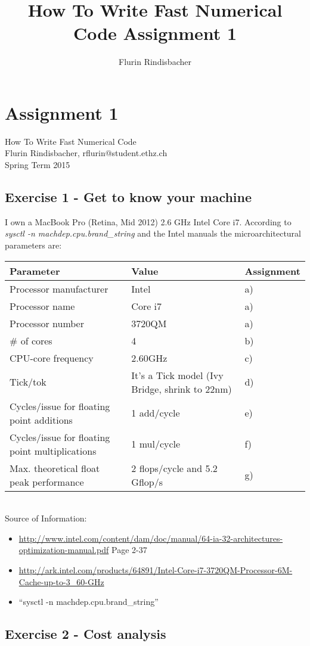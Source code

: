 \documentclass[10pt,a4paper,oneside]{report}
\author{Flurin Rindisbacher}
\title{How To Write Fast Numerical Code Assignment 1}
\begin{document}
\chapter*{Assignment 1}
How To Write Fast Numerical Code \\
Flurin Rindisbacher, rflurin@student.ethz.ch \\
Spring Term 2015
\section*{Exercise 1 - Get to know your machine}
I own a MacBook Pro (Retina, Mid 2012) 2.6 GHz Intel Core i7. According to \textit{sysctl -n machdep.cpu.brand\_string} and the Intel manuals the microarchitectural parameters are: \\

\begin{tabular}{|l|l|l|}
\hline 
\rowcolor{gray!30}
\textbf{Parameter} & \textbf{Value} & \textbf{Assignment} \\ 
\hline 
Processor manufacturer & Intel & a)\\ 
\hline 
Processor name & Core i7 & a)\\ 
\hline
Processor number & 3720QM  & a)\\ 
\hline
\# of cores & 4  & b) \\ 
\hline 
CPU-core frequency & 2.60GHz  & c)\\ 
\hline 
Tick/tok & It's a Tick model (Ivy Bridge, shrink to 22nm) & d) \\ 
\hline 
Cycles/issue for floating point additions & 1 add/cycle & e) \\ 
\hline 
Cycles/issue for floating point multiplications & 1 mul/cycle & f) \\ 
\hline 
Max. theoretical float peak performance & 2 flops/cycle and 5.2 Gflop/s & g) \\ 
\hline 
\end{tabular} 
\\
Source of Information:
\begin{itemize}
  \item \url{http://www.intel.com/content/dam/doc/manual/64-ia-32-architectures-optimization-manual.pdf} Page 2-37
  \item \url{http://ark.intel.com/products/64891/Intel-Core-i7-3720QM-Processor-6M-Cache-up-to-3_60-GHz}
  \item ``sysctl -n machdep.cpu.brand\_string''
\end{itemize}

\section*{Exercise 2 - Cost analysis}
\end{document}
